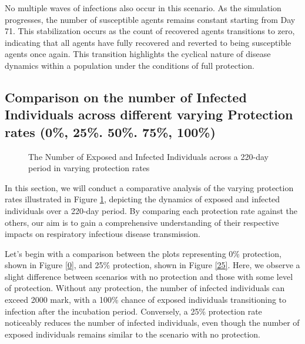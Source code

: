 No multiple waves of infections also occur in this scenario. As the simulation progresses, the number of susceptible agents remains constant starting from Day 71. This stabilization occurs as the count of recovered agents transitions to zero, indicating that all agents have fully recovered and reverted to being susceptible agents once again. This transition highlights the cyclical nature of disease dynamics within a population under the conditions of full protection.

\subsection{ Comparison on the number of Infected Individuals across different varying Protection rates (0\%, 25\%. 50\%. 75\%, 100\%)}


\begin{figure}[H]
	\centering
	
	\quad
	
	\quad
	
		
		\caption{The Number of Exposed and Infected Individuals across a 220-day period in varying protection rates}
		\label{Pr5}
\end{figure}
In this section, we will conduct a comparative analysis of the varying protection rates illustrated in Figure \ref{Pr5}, depicting the dynamics of exposed and infected individuals over a 220-day period. By comparing each protection rate against the others, our aim is to gain a comprehensive understanding of their respective impacts on respiratory infectious disease transmission.

Let's begin with a comparison between the plots representing 0\% protection, shown in Figure \ref{0}, and 25\% protection, shown in Figure \ref{25}. Here, we observe a slight difference between scenarios with no protection and those with some level of protection. Without any protection, the number of infected individuals can exceed 2000 mark, with a 100\% chance of exposed individuals transitioning to infection after the incubation period. Conversely, a 25\% protection rate noticeably reduces the number of infected individuals, even though the number of exposed individuals remains similar to the scenario with no protection.

